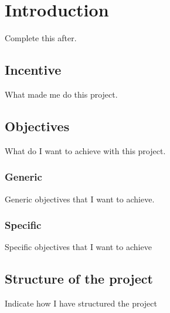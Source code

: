 \chapter{Introduction}

Complete this after.

\section{Incentive}
What made me do this project.


\section{Objectives}
What do I want to achieve with this project.

\subsection{Generic}
Generic objectives that I want to achieve.

\subsection{Specific}
Specific objectives that I want to achieve


\section{Structure of the project}
Indicate how I have structured the project

%	
%	
%	
